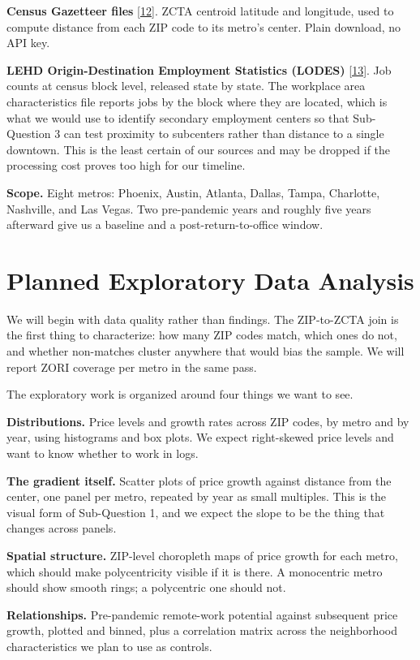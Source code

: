 \documentclass[11pt]{article}
\newcommand{\refl}[2]{\href{#2}{[#1]}}
\newcommand{\uGaz}{https://www.census.gov/geographies/reference-files/time-series/geo/gazetteer-files.html}
\newcommand{\uLodes}{https://lehd.ces.census.gov/data/}
\begin{document}
\textbf{Census Gazetteer files} \refl{12}{\uGaz}. ZCTA centroid latitude and
longitude, used to compute distance from each ZIP code to its metro's center.
Plain download, no API key.

\textbf{LEHD Origin-Destination Employment Statistics (LODES)}
\refl{13}{\uLodes}. Job counts at census block level, released state by state.
The workplace area characteristics file reports jobs by the block where they are
located, which is what we would use to identify secondary employment centers so
that Sub-Question 3 can test proximity to subcenters rather than distance to a
single downtown. This is the least certain of our sources and may be dropped if
the processing cost proves too high for our timeline.

\textbf{Scope.} Eight metros: Phoenix, Austin, Atlanta, Dallas, Tampa, Charlotte,
Nashville, and Las Vegas. Two pre-pandemic years and roughly five years afterward
give us a baseline and a post-return-to-office window.

\section{Planned Exploratory Data Analysis}

We will begin with data quality rather than findings. The ZIP-to-ZCTA join is the
first thing to characterize: how many ZIP codes match, which ones do not, and
whether non-matches cluster anywhere that would bias the sample. We will report
ZORI coverage per metro in the same pass.

The exploratory work is organized around four things we want to see.

\textbf{Distributions.} Price levels and growth rates across ZIP codes, by metro
and by year, using histograms and box plots. We expect right-skewed price levels
and want to know whether to work in logs.

\textbf{The gradient itself.} Scatter plots of price growth against distance from
the center, one panel per metro, repeated by year as small multiples. This is the
visual form of Sub-Question 1, and we expect the slope to be the thing that
changes across panels.

\textbf{Spatial structure.} ZIP-level choropleth maps of price growth for each
metro, which should make polycentricity visible if it is there. A monocentric
metro should show smooth rings; a polycentric one should not.

\textbf{Relationships.} Pre-pandemic remote-work potential against subsequent price
growth, plotted and binned, plus a correlation matrix across the neighborhood
characteristics we plan to use as controls.
\end{document}
